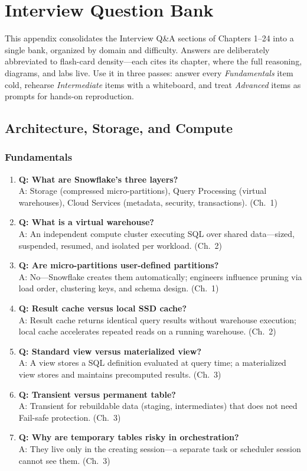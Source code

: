 \chapter{Interview Question Bank}
%
This appendix consolidates the Interview Q\&A sections of Chapters 1--24 into a single bank,
organized by domain and difficulty. Answers are deliberately abbreviated to flash-card
density---each cites its chapter, where the full reasoning, diagrams, and labs live. Use it in
three passes: answer every \emph{Fundamentals} item cold, rehearse \emph{Intermediate} items
with a whiteboard, and treat \emph{Advanced} items as prompts for hands-on reproduction.

\section{Architecture, Storage, and Compute}

\subsection{Fundamentals}
\begin{enumerate}
    \item \textbf{Q: What are Snowflake's three layers?}\\
    A: Storage (compressed micro-partitions), Query Processing (virtual warehouses), Cloud Services (metadata, security, transactions). (Ch.~1)
    \item \textbf{Q: What is a virtual warehouse?}\\
    A: An independent compute cluster executing SQL over shared data---sized, suspended, resumed, and isolated per workload. (Ch.~2)
    \item \textbf{Q: Are micro-partitions user-defined partitions?}\\
    A: No---Snowflake creates them automatically; engineers influence pruning via load order, clustering keys, and schema design. (Ch.~1)
    \item \textbf{Q: Result cache versus local SSD cache?}\\
    A: Result cache returns identical query results without warehouse execution; local cache accelerates repeated reads on a running warehouse. (Ch.~2)
    \item \textbf{Q: Standard view versus materialized view?}\\
    A: A view stores a SQL definition evaluated at query time; a materialized view stores and maintains precomputed results. (Ch.~3)
    \item \textbf{Q: Transient versus permanent table?}\\
    A: Transient for rebuildable data (staging, intermediates) that does not need Fail-safe protection. (Ch.~3)
    \item \textbf{Q: Why are temporary tables risky in orchestration?}\\
    A: They live only in the creating session---a separate task or scheduler session cannot see them. (Ch.~3)
\end{enumerate}

